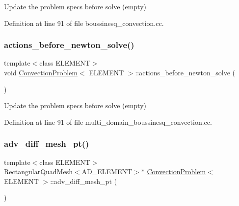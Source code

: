 Update the problem specs before solve (empty) 



Definition at line 91 of file boussinesq\+\_\+convection.\+cc.

\mbox{\label{classConvectionProblem_a2fe48dd44ece8a0a69539ffcdce9ec11}} 
\subsubsection{\texorpdfstring{actions\+\_\+before\+\_\+newton\+\_\+solve()}{actions\_before\_newton\_solve()}\hspace{0.1cm}{\footnotesize\ttfamily [2/2]}}
{\footnotesize\ttfamily template$<$class E\+L\+E\+M\+E\+NT$>$ \\
void \hyperlink{classConvectionProblem}{Convection\+Problem}$<$ E\+L\+E\+M\+E\+NT $>$\+::actions\+\_\+before\+\_\+newton\+\_\+solve (\begin{DoxyParamCaption}{ }\end{DoxyParamCaption})\hspace{0.3cm}{\ttfamily [inline]}}



Update the problem specs before solve (empty) 



Definition at line 91 of file multi\+\_\+domain\+\_\+boussinesq\+\_\+convection.\+cc.

\mbox{\label{classConvectionProblem_a2c9c128da7f75c636ea04ac5643abf39}} 
\subsubsection{\texorpdfstring{adv\+\_\+diff\+\_\+mesh\+\_\+pt()}{adv\_diff\_mesh\_pt()}}
{\footnotesize\ttfamily template$<$class E\+L\+E\+M\+E\+NT$>$ \\
Rectangular\+Quad\+Mesh$<$A\+D\+\_\+\+E\+L\+E\+M\+E\+NT$>$$\ast$ \hyperlink{classConvectionProblem}{Convection\+Problem}$<$ E\+L\+E\+M\+E\+NT $>$\+::adv\+\_\+diff\+\_\+mesh\+\_\+pt (\begin{DoxyParamCaption}{ }\end{DoxyParamCaption})\hspace{0.3cm}{\ttfamily [inline]}}




